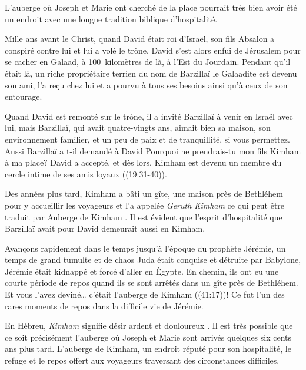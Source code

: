 

L'auberge où Joseph et Marie ont cherché de la place pourrait très bien avoir été un endroit avec une longue tradition biblique d'hospitalité.

Mille ans avant le Christ, quand David était roi d'Israël, son fils Absalon a conspiré contre lui et lui a volé le trône. David s'est alors enfui de Jérusalem pour se cacher en Galaad, à 100~kilomètres de là, à l'Est du Jourdain. Pendant qu'il était là, un riche propriétaire terrien du nom de Barzillaï le Galaadite est devenu son ami, l'a reçu chez lui et a pourvu à tous ses besoins ainsi qu'à ceux de son entourage.

Quand David est remonté sur le trône, il a invité Barzillaï à venir en Israël avec lui, mais Barzillaï, qui avait quatre-vingts ans, aimait bien sa maison, son environnement familier, \Og et un peu de paix et de tranquillité, si vous permettez. \Fg{} Aussi Barzillaï a t-il demandé à David\frcolon{} \Og Pourquoi ne prendrais-tu mon fils Kimham à ma place? \Fg{} David a accepté, et dès lors, Kimham est devenu un membre du cercle intime de ses amis loyaux ((19:31-40)).

Des années plus tard, Kimham a bâti un gîte, une maison près de Bethléhem pour y accueillir les voyageurs et l'a appelée \emph{Geruth Kimham} ce qui peut être traduit par \Og Auberge de Kimham \Fg{}. Il est évident que l'esprit d'hospitalité que Barzillaï avait pour David demeurait aussi en Kimham.

Avançons rapidement dans le temps jusqu'à l'époque du prophète Jérémie, un temps de grand tumulte et de chaos \ocadr Juda était conquise et détruite par Babylone, Jérémie était kidnappé et forcé d'aller en Égypte. En chemin, ils ont eu une courte période de repos quand ils se sont arrêtés dans un gîte près de Bethléhem. Et vous l'avez deviné… c'était l'auberge de Kimham ((41:17))! Ce fut l'un des rares moments de repos dans la difficile vie de Jérémie.

En Hébreu, \emph{Kimham} signifie \Og désir ardent et douloureux \Fg{}. Il est très possible que ce soit précisément l'auberge où Joseph et Marie sont arrivés quelques six cents ans plus tard. L'auberge de Kimham, un endroit r\'eput\'e pour son hospitalité, le refuge et le repos offert aux voyageurs traversant des circonstances difficiles.


